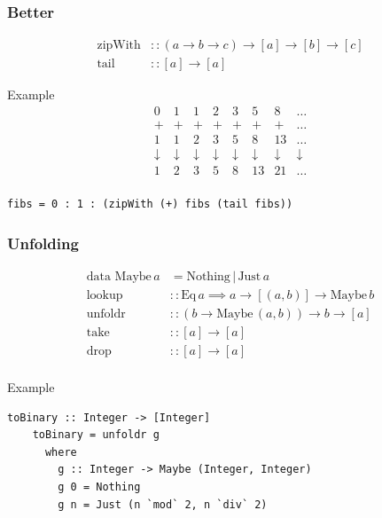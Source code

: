 \documentclass{beamer}
\begin{document}
\begin{frame}[fragile]
\frametitle{Better}

$$
\begin{aligned}
  \textrm{zipWith} &:: (a \longrightarrow b \longrightarrow c) \longrightarrow [a] \longrightarrow [b] \longrightarrow [c] \\
  \textrm{tail} &:: [a] \longrightarrow [a]
\end{aligned}
$$
\vspace{0.1cm}
\begin{block}{Example}
  $$
  \begin{array}{rrrrrrrr}
    0 & 1 & 1 & 2 & 3 & 5 & 8 & \ldots \\
    + & + & + & + & + & + & + & \ldots \\
    1 & 1 & 2 & 3 & 5 & 8 & 13 & \ldots \\
    \downarrow & \downarrow & \downarrow & \downarrow & \downarrow & \downarrow & \downarrow & \downarrow \\
    1 & 2 & 3 & 5 & 8 & 13 & 21 & \ldots \\
  \end{array}
  $$
  \begin{lstlisting}[basicstyle=\small]
    fibs = 0 : 1 : (zipWith (+) fibs (tail fibs))
  \end{lstlisting}
\end{block}

\end{frame}


\begin{frame}[fragile]
\frametitle{Unfolding}

$$
\begin{aligned}
  \textrm{data Maybe}\, a &= \textrm{Nothing}\, |\, \textrm{Just}\, a \\
  \textrm{lookup} &:: \textrm{Eq}\, a \implies a \longrightarrow [(a, b)] \longrightarrow \textrm{Maybe}\, b \\
  \textrm{unfoldr} &:: (b \longrightarrow \textrm{Maybe}\, (a,b)) \longrightarrow b \longrightarrow [a] \\
  \textrm{take} &:: [a] \longrightarrow [a] \\
  \textrm{drop} &:: [a] \longrightarrow [a] \\
\end{aligned}
$$
\vspace{0.1cm}
\begin{block}{Example}
  \begin{lstlisting}[basicstyle=\small]
    toBinary :: Integer -> [Integer]
    toBinary = unfoldr g
      where
        g :: Integer -> Maybe (Integer, Integer)
        g 0 = Nothing
        g n = Just (n `mod` 2, n `div` 2)
  \end{lstlisting}
\end{block}

\end{frame}
\end{document}
